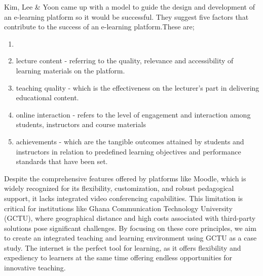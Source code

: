 \documentclass[a4paper,12pt]{article}  %
\begin{document}
Kim, Lee \& Yoon \cite{kim2023better}came up with a model to guide the design and development of an
e-learning platform so it would be successful. They suggest five factors that
contribute to the success of an e-learning platform.These are;
\begin{enumerate}
  \item {}
  \item lecture content - referring to the quality, relevance and accessibility of
        learning materials on the platform.\\
  \item teaching quality - which is the effectiveness on the lecturer's part in
        delivering educational content.\\
  \item online interaction - refers to the level of engagement and interaction among
        students, instructors and course materials\\
  \item achievements - which are the tangible outcomes attained by students and
        instructors in relation to predefined learning objectives and performance
        standards that have been set.\\
\end{enumerate}
Despite the comprehensive features offered by platforms like Moodle, which is widely recognized for its flexibility, customization, and robust pedagogical support, it lacks integrated video conferencing capabilities. This limitation is critical for institutions like Ghana Communication Technology University (GCTU), where geographical distance and high costs associated with third-party solutions pose significant challenges. By focusing on these core principles, we aim to create an integrated teaching and learning environment using GCTU as a case study. The internet is the perfect tool for learning, as it offers flexibility and expediency to learners at the same time offering endless opportunities for innovative teaching.
\end{document}
